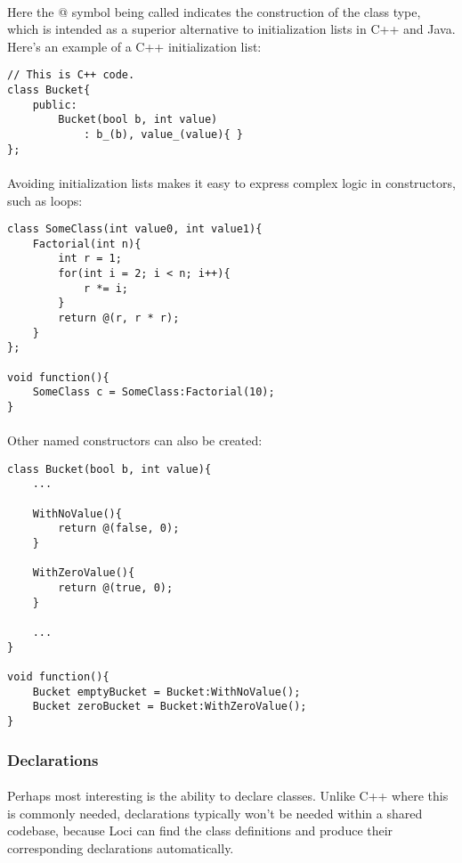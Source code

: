 \documentclass[12pt,twoside,notitlepage]{report}
\begin{document}
\paragraph{}
Here the @ symbol being called indicates the construction of the class type, which is intended as a superior alternative to initialization lists in C++ and Java. Here's an example of a C++ initialization list:


\begin{lstlisting}
// This is C++ code.
class Bucket{
	public:
		Bucket(bool b, int value)
			: b_(b), value_(value){ }
};
\end{lstlisting}


\paragraph{}
Avoiding initialization lists makes it easy to express complex logic in constructors, such as loops:


\begin{lstlisting}
class SomeClass(int value0, int value1){
	Factorial(int n){
		int r = 1;
		for(int i = 2; i < n; i++){
			r *= i;
		}
		return @(r, r * r);
	}
};

void function(){
	SomeClass c = SomeClass:Factorial(10);
}
\end{lstlisting}


\paragraph{}
Other named constructors can also be created:


\begin{lstlisting}
class Bucket(bool b, int value){
	...
	
	WithNoValue(){
		return @(false, 0);
	}
	
	WithZeroValue(){
		return @(true, 0);
	}

	...
}

void function(){
	Bucket emptyBucket = Bucket:WithNoValue();
	Bucket zeroBucket = Bucket:WithZeroValue();
}
\end{lstlisting}


\subsubsection{Declarations}

\paragraph{}
Perhaps most interesting is the ability to declare classes. Unlike C++ where this is commonly needed, declarations typically won't be needed within a shared codebase, because Loci can find the class definitions and produce their corresponding declarations automatically.
\end{document}
